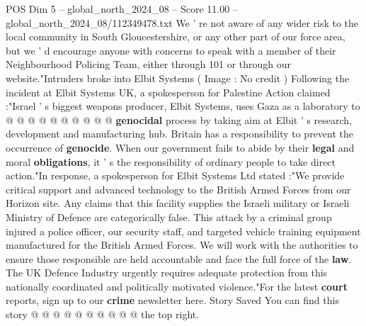 \begin{textsample}{POS Dim 5 – global\_north\_2024\_08 – Score 11.00 – global\_north\_2024\_08/112349478.txt}
We ' re not aware of any wider risk to the local community in South Gloucestershire, or any other part of our force area, but we ' d encourage anyone with concerns to speak with a member of their Neighbourhood Policing Team, either through 101 or through our website."Intruders broke into Elbit Systems ( Image : No credit ) Following the incident at Elbit Systems UK, a spokesperson for Palestine Action claimed :"Israel ' s biggest weapons producer, Elbit Systems, uses Gaza as a laboratory to @ @ @ @ @ @ @ @ @ @ \textbf{genocidal} process by taking aim at Elbit ' s research, development and manufacturing hub.
Britain has a responsibility to prevent the occurrence of \textbf{genocide}.
When our government fails to abide by their \textbf{legal} and moral \textbf{obligations}, it ' s the responsibility of ordinary people to take direct action."In response, a spokesperson for Elbit Systems Ltd stated :"We provide critical support and advanced technology to the British Armed Forces from our Horizon site.
Any claims that this facility supplies the Israeli military or Israeli Ministry of Defence are categorically false.
This attack by a criminal group injured a police officer, our security staff, and targeted vehicle training equipment manufactured for the British Armed Forces.
We will work with the authorities to ensure those responsible are held accountable and face the full force of the \textbf{law}.
The UK Defence Industry urgently requires adequate protection from this nationally coordinated and politically motivated violence."For the latest \textbf{court} reports, sign up to our \textbf{crime} newsletter here.
Story Saved You can find this story @ @ @ @ @ @ @ @ @ @ the top right.

\end{textsample}
